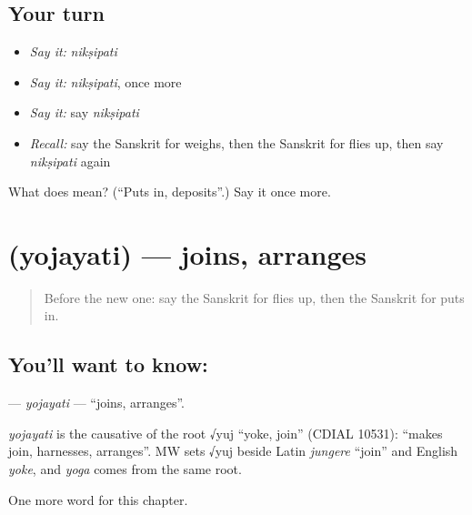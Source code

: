 \subsection*{Your turn}
\begin{itemize}
\raggedright
  \item \emph{Say it:} \emph{nikṣipati}
  \item \emph{Say it:} \emph{nikṣipati}, once more
  \item \emph{Say it:} say \emph{nikṣipati}
  \item \emph{Recall:} say the Sanskrit for weighs, then the Sanskrit for flies up, then say \emph{nikṣipati} again
\end{itemize}

\begin{tcolorbox}[breakable,colback=teal!4,colframe=teal!35!black,title={Before you move on}]
What does  mean? (\textquotedblleft{}Puts in, deposits\textquotedblright{}.) Say it once more.
\end{tcolorbox}
\section[\texorpdfstring{\sk{योजयति} (yojayati)}{योजयति (yojayati)}]{ (yojayati) — joins, arranges}

\label{lesson:SA-C144-yojayati}



\begin{quote}
Before the new one: say the Sanskrit for flies up, then the Sanskrit for puts in.
\end{quote}

\subsection*{You'll want to know: }
\textbf{} — \emph{yojayati} — \textquotedblleft{}joins, arranges\textquotedblright{}.

\begin{cousinweb}
\emph{yojayati} is the causative of the root √yuj \textquotedblleft{}yoke, join\textquotedblright{} (CDIAL 10531): \textquotedblleft{}makes join, harnesses, arranges\textquotedblright{}. MW sets √yuj beside Latin \emph{jungere} \textquotedblleft{}join\textquotedblright{} and English \emph{yoke}, and \emph{yoga} comes from the same root.
\end{cousinweb}

\begin{grammarlens}[title={What you've built}]
One more word for this chapter.
\end{grammarlens}

